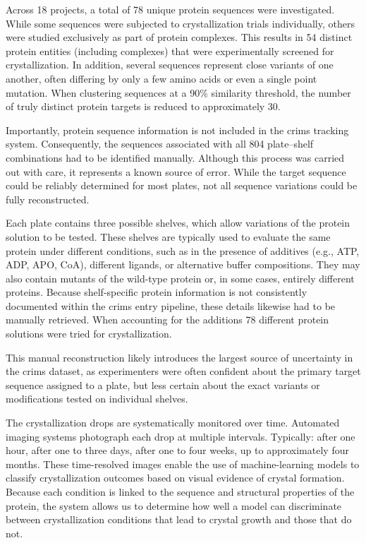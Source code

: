 Across 18 projects, a total of 78 unique protein sequences were investigated. While some sequences were subjected to crystallization trials individually, others were studied exclusively as part of protein complexes. This results in 54 distinct protein entities (including complexes) that were experimentally screened for crystallization. In addition, several sequences represent close variants of one another, often differing by only a few amino acids or even a single point mutation. When clustering sequences at a 90\% similarity threshold, the number of truly distinct protein targets is reduced to approximately 30. 

Importantly, protein sequence information is not included in the \gls{crims} tracking system. Consequently, the sequences associated with all 804 plate–shelf combinations had to be identified manually. Although this process was carried out with care, it represents a known source of error. While the target sequence could be reliably determined for most plates, not all sequence variations could be fully reconstructed.

Each plate contains three possible shelves, which allow variations of the protein solution to be tested. These shelves are typically used to evaluate the same protein under different conditions, such as in the presence of additives (e.g., ATP, ADP, APO, CoA), different ligands, or alternative buffer compositions. They may also contain mutants of the wild-type protein or, in some cases, entirely different proteins. Because shelf-specific protein information is not consistently documented within the \gls{crims} entry pipeline, these details likewise had to be manually retrieved. When accounting for the additions 78 different protein solutions were tried for crystallization. 

This manual reconstruction likely introduces the largest source of uncertainty in the \gls{crims} dataset, as experimenters were often confident about the primary target sequence assigned to a plate, but less certain about the exact variants or modifications tested on individual shelves.

The crystallization drops are systematically monitored over time. Automated imaging systems photograph each drop at multiple intervals. Typically: after one hour, after one to three days, after one to four weeks, up to approximately four months. These time-resolved images enable the use of machine-learning models to classify crystallization outcomes based on visual evidence of crystal formation. Because each condition is linked to the sequence and structural properties of the protein, the system allows us to determine how well a model can discriminate between crystallization conditions that lead to crystal growth and those that do not.

